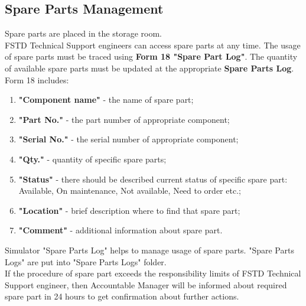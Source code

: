     \subsection{Spare Parts Management}
        Spare parts are placed in the storage room. \\ 
        \vspace{3mm}
        FSTD Technical Support engineers can access spare parts at any time. The usage of spare parts must be traced using \textbf{Form 18 "Spare Part Log"}. 
        The quantity of available spare parts must be updated at the appropriate \textbf{Spare Parts Log}. \\
        \vspace{3mm}
        Form 18 includes:
        \begin{enumerate}
            \item \textbf{"Component name"} - the name of spare part;
            \item \textbf{"Part No."} - the part number of appropriate component;
            \item \textbf{"Serial No."} - the serial number of appropriate component;
            \item \textbf{"Qty."} - quantity of specific spare parts;
            \item \textbf{"Status"} - there should be described current status of specific spare part: Available, On maintenance, Not available, Need to order etc.;
            \item \textbf{"Location"} - brief description where to find that spare part;
            \item \textbf{"Comment"} - additional information about spare part.
        \end{enumerate}
        Simulator "Spare Parts Log" helps to manage usage of spare parts. "Spare Parts Logs" are put into "Spare Parts Logs" folder. \\ 
        \vspace{3mm}
        If the procedure of spare part exceeds the responsibility limits of FSTD Technical Support engineer, then Accountable Manager will be informed about required 
        spare part in 24 hours to get confirmation about further actions.


